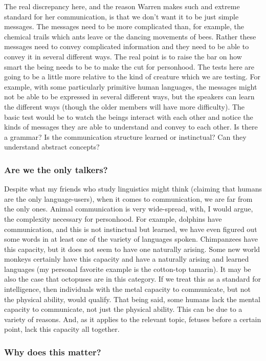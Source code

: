 The real discrepancy here, and the reason Warren makes such and extreme standard for her communication, is that we don't want it to be just simple messages. The messages need to be more complicated than, for example, the chemical trails which ants leave or the dancing movements of bees. Rather these messages need to convey complicated information and they need to be able to convey it in several different ways.  The real point is to raise the bar on how smart the being needs to be to make the cut for personhood. The tests here are going to be a little more relative to the kind of creature which we are testing. For example, with some particularly primitive human languages, the messages might not be able to be expressed in several different ways, but the speakers can learn the different ways (though the older members will have more difficulty). The basic test would be to watch the beings interact with each other and notice the kinds of messages they are able to understand and convey to each other. Is there a grammar? Is the communication structure learned or instinctual? Can they understand abstract concepts?   
\subsubsection{Are we the only talkers?}

Despite what my friends who study linguistics might think (claiming that humans are the only language-users), when it comes to communication, we are far from the only ones. Animal communication is very wide-spread, with, I would argue, the complexity necessary for personhood. For example, dolphins have communication, and this is not instinctual but learned, we have even figured out some words in at least one of the variety of languages spoken.\autocite{tedtalksdirector2013} Chimpanzees have this capacity, but it does not seem to have one naturally arising. Some new world monkeys certainly have this capacity and have a naturally arising and learned languages (my personal favorite example is the cotton-top tamarin)\autocite{tededucation2014}. It may be also the case that octopuses are in this category.  If we treat this as a standard for intelligence, then individuals with the metal capacity to communicate, but not the physical ability, would qualify. That being said, some humans lack the mental capacity to communicate, not just the physical ability. This can be due to a variety of reasons.  And, as it applies to the relevant topic, fetuses before a certain point, lack this capacity all together.
\subsubsection{Why does this matter?}

